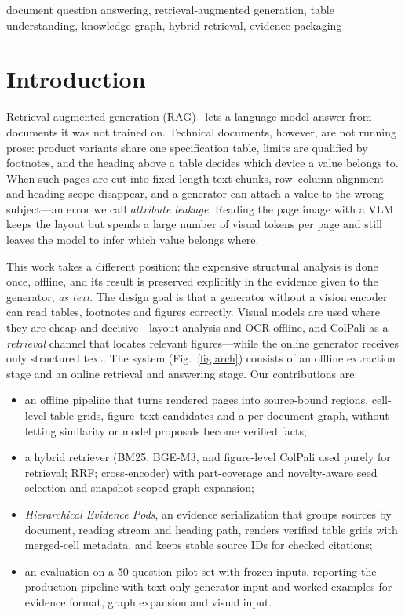 \documentclass[conference]{IEEEtran}
\begin{document}
\begin{IEEEkeywords}
document question answering, retrieval-augmented generation, table understanding, knowledge graph, hybrid retrieval, evidence packaging
\end{IEEEkeywords}

\section{Introduction}
Retrieval-augmented generation (RAG)~\cite{lewis2020rag} lets a language model answer from documents it was not trained on. Technical documents, however, are not running prose: product variants share one specification table, limits are qualified by footnotes, and the heading above a table decides which device a value belongs to. When such pages are cut into fixed-length text chunks, row--column alignment and heading scope disappear, and a generator can attach a value to the wrong subject---an error we call \emph{attribute leakage}. Reading the page image with a VLM~\cite{mathew2021docvqa,bai2025qwen25vl} keeps the layout but spends a large number of visual tokens per page and still leaves the model to infer which value belongs where.

This work takes a different position: the expensive structural analysis is done once, offline, and its result is preserved explicitly in the evidence given to the generator, \emph{as text}. The design goal is that a generator without a vision encoder can read tables, footnotes and figures correctly. Visual models are used where they are cheap and decisive---layout analysis and OCR offline, and ColPali as a \emph{retrieval} channel that locates relevant figures---while the online generator receives only structured text. The system (Fig.~\ref{fig:arch}) consists of an offline extraction stage and an online retrieval and answering stage. Our contributions are:
\begin{itemize}
\item an offline pipeline that turns rendered pages into source-bound regions, cell-level table grids, figure--text candidates and a per-document graph, without letting similarity or model proposals become verified facts;
\item a hybrid retriever (BM25, BGE-M3, and figure-level ColPali used purely for retrieval; RRF; cross-encoder) with part-coverage and novelty-aware seed selection and snapshot-scoped graph expansion;
\item \emph{Hierarchical Evidence Pods}, an evidence serialization that groups sources by document, reading stream and heading path, renders verified table grids with merged-cell metadata, and keeps stable source IDs for checked citations;
\item an evaluation on a 50-question pilot set with frozen inputs, reporting the production pipeline with text-only generator input and worked examples for evidence format, graph expansion and visual input.
\end{itemize}
\end{document}
